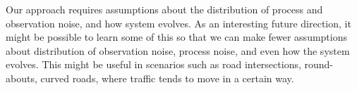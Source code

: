 \documentclass[a4paper]{article}
\begin{document}
Our approach requires assumptions about the distribution of process and
observation noise, and how system evolves.
As an interesting future direction,
it might be possible to learn some of this so that we can make fewer 
assumptions about distribution of observation noise, process noise,
and even how the system evolves.
This might be useful in scenarios such as road intersections, round-abouts,
curved roads, where traffic tends to move in a certain way.

\pagebreak

{}

\end{document}
